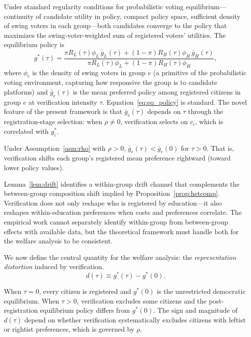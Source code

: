 Under standard regularity conditions for probabilistic voting equilibrium---continuity of candidate utility in policy, compact policy space, sufficient density of swing voters in each group---both candidates converge to the policy that maximizes the swing-voter-weighted sum of registered voters' utilities. The equilibrium policy is
\begin{equation}
g^*(\tau) = \frac{\pi R_L(\tau) \phi_L \, \bar g_L(\tau) + (1-\pi) R_H(\tau) \phi_H \, \bar g_H(\tau)}{\pi R_L(\tau) \phi_L + (1-\pi) R_H(\tau) \phi_H},
\label{eq:eq_policy}
\end{equation}
where $\phi_e$ is the density of swing voters in group $e$ (a primitive of the probabilistic voting environment, capturing how responsive the group is to candidate platforms) and $\bar g_e(\tau)$ is the mean preferred policy among registered citizens in group $e$ at verification intensity $\tau$. Equation~\eqref{eq:eq_policy} is standard. The novel feature of the present framework is that $\bar g_e(\tau)$ depends on $\tau$ through the registration-stage selection: when $\rho \neq 0$, verification selects on $c_i$, which is correlated with $g_i^*$.

\begin{lemma}
\label{lem:drift}
Under Assumption~\ref{asm:rho} with $\rho > 0$, $\bar g_e(\tau) < \bar g_e(0)$ for $\tau > 0$. That is, verification shifts each group's registered mean preference rightward (toward lower policy values).
\end{lemma}

Lemma~\ref{lem:drift} identifies a within-group drift channel that complements the between-group composition shift implied by Proposition~\ref{prop:hetcomp}. Verification does not only reshape who is registered by education---it also reshapes within-education preferences when costs and preferences correlate. The empirical work cannot separately identify within-group from between-group effects with available data, but the theoretical framework must handle both for the welfare analysis to be consistent.

We now define the central quantity for the welfare analysis: the \emph{representation distortion} induced by verification.
\begin{equation}
d(\tau) \equiv g^*(\tau) - g^*(0).
\label{eq:representation_distortion}
\end{equation}

When $\tau = 0$, every citizen is registered and $g^*(0)$ is the unrestricted democratic equilibrium. When $\tau > 0$, verification excludes some citizens and the post-registration equilibrium policy differs from $g^*(0)$. The sign and magnitude of $d(\tau)$ depend on whether verification systematically excludes citizens with leftist or rightist preferences, which is governed by $\rho$.

